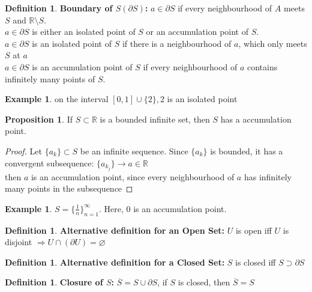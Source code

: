 \documentclass[12pt]{article}
\theoremstyle{plain}
\theoremstyle{definition}
\newtheorem{definition}[theorem]{Definition}
\newtheorem{example}[theorem]{Example}
\newtheorem{proposition}[theorem]{Proposition}
\begin{document}
\begin{definition}
	\textbf{Boundary of $S (\partial S)$:} $a\in \partial S$ if every neighbourhood of $A$ meets $S$ and $\mathbb{R}\setminus S$.\\
	$a\in \partial S$ is either an isolated point of $S$ or an accumulation point of $S$.\\
	$a\in \partial S$ is an isolated point of $S$ if there is a neighbourhood of $a$, which only meets $S$ at $a$\\
	$a\in \partial S$ is an accumulation point of $S$ if every neighbourhood of $a$ contains infinitely many points of $S$.
\end{definition}

\begin{example}
	on the interval $[0,1] \cup \{2 \}, 2$ is an isolated point
\end{example}

\begin{proposition}
	If $S \subset \mathbb{R}$ is a bounded infinite set, then $S$ has a accumulation point.
\end{proposition}

\begin{proof}
	Let $\{ a_k \} \subset S$ be an infinite sequence. Since $\{ a_k \} $ is bounded, it has a convergent subsequence: $\{ a_{k_j} \} \to a \in \mathbb{R}$
	\\
	then $a$ is an accumulation point, since every neighbourhood of $a$ has infinitely many points in the subsequence
\end{proof}

\begin{example}
	$S = \{ \frac{1}{n} \}^\infty_{n=1}$. Here, 0 is an accumulation point.
\end{example}

\begin{definition}
	\textbf{Alternative definition for an Open Set:} $U$ is open iff $U$ is disjoint $\Longrightarrow U \cap (\partial U )= \varnothing$
\end{definition}

\begin{definition}
	\textbf{Alternative definition for a Closed Set:} $S$ is closed iff $S \supset \partial S$
\end{definition}

\begin{definition}
	\textbf{Closure of $S$:} $\overline{S} = S \cup \partial S$, if $S$ is closed, then $\overline{S} = S$
\end{definition}
\end{document}
